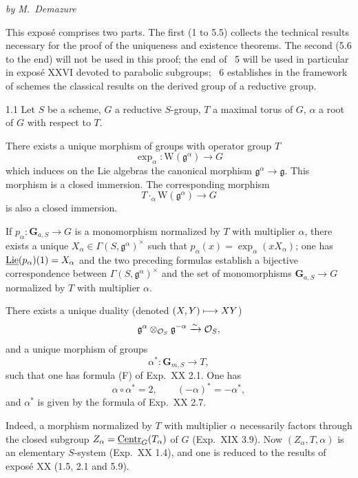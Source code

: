 \label{XXII}
\begin{center}\textit{by M.~Demazure}\end{center}
{\renewcommand{\thefootnote}{(0)}}%
This expos\'e comprises two parts. The first (1 to 5.5) collects the technical results necessary for the proof of the uniqueness and existence theorems. The second (5.6 to the end) will not be used in this proof; the end of \No~5 will be used in particular in expos\'e XXVI devoted to parabolic subgroups; \No~6 establishes in the framework of schemes the classical results on the derived group of a reductive group.

\label{XXII.sec.1}
\begin{theorem}{1.1}\label{XXII.1.1}
Let $S$ be a scheme, $G$ a reductive $S$-group, $T$ a maximal torus of $G$, $\alpha$ a root of $G$ with respect to $T$.
\begin{enumeratei}
\item There exists a unique morphism of groups with operator group $T$
\[
\exp_\alpha:\mathrm W(\mathfrak g^\alpha)\to G
\]
which induces on the Lie algebras the canonical morphism $\mathfrak g^\alpha\to\mathfrak g$. This morphism is a closed immersion. The corresponding morphism
\[
T\mathbin{\cdot_\alpha}\mathrm W(\mathfrak g^\alpha)\to G
\]
is also a closed immersion.

If $p_\alpha:\mathbf G_{a,S}\to G$ is a monomorphism normalized by $T$ with multiplier $\alpha$, there exists a unique $X_\alpha\in\Gamma(S,\mathfrak g^\alpha)^\times${\renewcommand{\thefootnote}{(1)}} such that $p_\alpha(x)=\exp_\alpha(xX_\alpha)$; one has $\underline{\operatorname{Lie}}(p_\alpha)(1)=X_\alpha$ and the two preceding formulas establish a bijective correspondence between $\Gamma(S,\mathfrak g^\alpha)^\times$ and the set of monomorphisms $\mathbf G_{a,S}\to G$ normalized by $T$ with multiplier $\alpha$.
\item There exists a unique duality (denoted $(X,Y)\longmapsto XY$)
\[
\mathfrak g^\alpha\otimes_{\mathcal{O}_S}\mathfrak g^{-\alpha}\xrightarrow{\sim}\mathcal{O}_S,
\]
and a unique morphism of groups
\[
\alpha^*:\mathbf G_{m,S}\to T,
\]
such that one has formula (F) of Exp.~XX 2.1. One has
\[
\alpha\circ\alpha^*=2,\qquad(-\alpha)^*=-\alpha^*,
\]
and $\alpha^*$ is given by the formula of Exp.~XX 2.7.
\end{enumeratei}
\end{theorem}
Indeed, a morphism normalized by $T$ with multiplier $\alpha$ necessarily factors through the closed subgroup $Z_\alpha=\underline{\mathrm{Centr}}_G(T_\alpha)$ of $G$ (\cf Exp.~XIX 3.9). Now $(Z_\alpha,T,\alpha)$ is an elementary $S$-system (Exp.~XX 1.4), and one is reduced to the results of expos\'e XX (1.5, 2.1 and 5.9).

